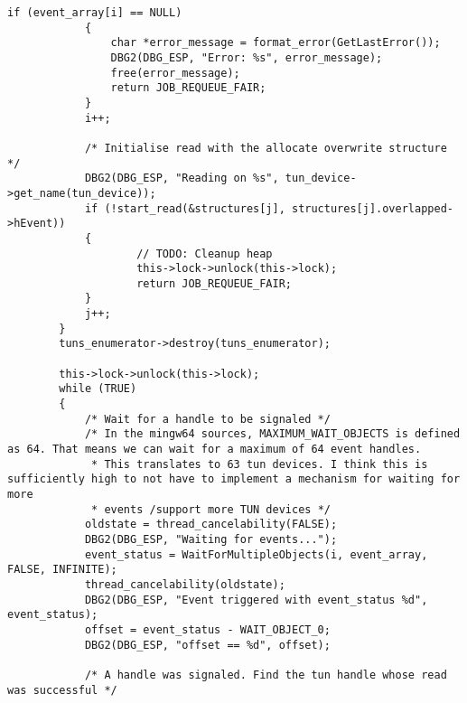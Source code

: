 \begin{lstlisting}[caption=Code für handle\_plain auf Windows,label=lst:handle-plain-windows]
            if (event_array[i] == NULL)
            {
                char *error_message = format_error(GetLastError());
                DBG2(DBG_ESP, "Error: %s", error_message);
                free(error_message);
                return JOB_REQUEUE_FAIR;
            }
            i++;

            /* Initialise read with the allocate overwrite structure */
            DBG2(DBG_ESP, "Reading on %s", tun_device->get_name(tun_device));
            if (!start_read(&structures[j], structures[j].overlapped->hEvent))
            {
                    // TODO: Cleanup heap
                    this->lock->unlock(this->lock);
                    return JOB_REQUEUE_FAIR;
            }
            j++;
        }
        tuns_enumerator->destroy(tuns_enumerator);

        this->lock->unlock(this->lock);
        while (TRUE)
        {
            /* Wait for a handle to be signaled */
            /* In the mingw64 sources, MAXIMUM_WAIT_OBJECTS is defined as 64. That means we can wait for a maximum of 64 event handles.
             * This translates to 63 tun devices. I think this is sufficiently high to not have to implement a mechanism for waiting for more
             * events /support more TUN devices */
            oldstate = thread_cancelability(FALSE);
            DBG2(DBG_ESP, "Waiting for events...");
            event_status = WaitForMultipleObjects(i, event_array, FALSE, INFINITE);
            thread_cancelability(oldstate);
            DBG2(DBG_ESP, "Event triggered with event_status %d", event_status);
            offset = event_status - WAIT_OBJECT_0;
            DBG2(DBG_ESP, "offset == %d", offset);
            
            /* A handle was signaled. Find the tun handle whose read was successful */


\end{lstlisting}
